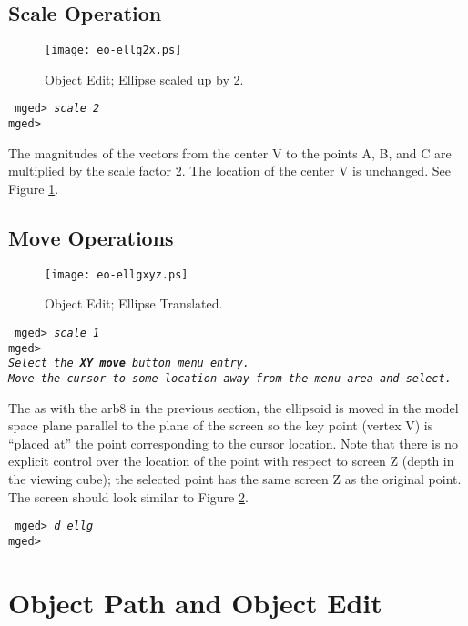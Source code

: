 \subsection{Scale Operation}

\begin{figure}
\centering \texttt{[image: eo-ellg2x.ps]}
\caption{Object Edit; Ellipse scaled up by 2.}
\label{eo-ellg2x}
\end{figure}

\noindent
{\tt
mged> {\em scale 2}\\
mged>\\
}

The magnitudes of the vectors from the center V to the points A, B, and C
are multiplied by the scale factor 2.  The location of the center V is
unchanged.  See Figure \ref{eo-ellg2x}.

\subsection{Move Operations}

\begin{figure}
\centering \texttt{[image: eo-ellgxyz.ps]}
\caption{Object Edit; Ellipse Translated.}
\label{eo-ellgxyz}
\end{figure}

\noindent
{\tt
mged> {\em scale 1}\\
mged>\\
{\em Select the {\bf XY move} button menu entry.}\\
{\em Move the cursor to some location away from the menu area and select.}\\
}

The as with the arb8 in the previous section, the ellipsoid is moved
in the model space plane parallel to the plane of the screen so the
key point (vertex V) is ``placed at'' the point corresponding to the
cursor location.  Note that there is no explicit control over the
location of the point with respect to screen Z (depth in the viewing
cube); the selected point has the same screen Z as the original point.
The screen should look similar to Figure \ref{eo-ellgxyz}.

\noindent
{\tt
mged> {\em d ellg}\\
mged>\\
}

\section{Object Path and Object Edit}


